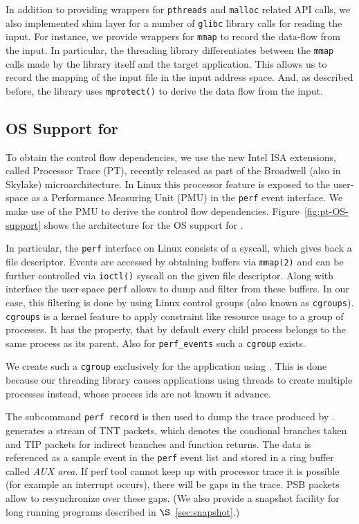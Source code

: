  In addition to providing wrappers for {\tt pthreads} and {\tt malloc} related API calls, we also implemented shim layer for a number of {\tt glibc} library calls for reading the input. For instance, we provide wrappers for {\tt mmap} to record the data-flow from the input. In particular, the threading library differentiates between the {\tt mmap} calls made by the library itself and the target application. This allows us to record the mapping of the input file in the input address space. And, as described before, the library uses {\tt mprotect()} to derive the data flow from the input. 


\subsection{OS Support for \intelpt}

To obtain the control flow dependencies, we use the new Intel ISA extensions, called Processor Trace (PT), recently released as part of the Broadwell (also in Skylake) microarchitecture. In Linux this processor feature is exposed to the user-space as a Performance Measuring Unit (PMU) in the {\tt perf} event interface. We make use of the \intelpt PMU to derive the control flow dependencies. Figure~\ref{fig:pt-OS-support} shows the architecture for the OS support for \intelpt.



In particular, the {\tt perf} interface on Linux consists of a syscall, which gives back a file
descriptor. Events are accessed by obtaining buffers via {\tt mmap(2)} and can be
further controlled via {\tt ioctl()} syscall on the given file descriptor. Along with
interface the user-space {\tt perf} allows to dump and filter from these
buffers. In our case, this filtering is done by using Linux control
groups (also known as {\tt cgroups}). {\tt cgroups} is a kernel feature to apply constraint
like resource usage to a group of processes. It has the property, that by
default every child process belongs to the same process as its parent. Also for
{\tt perf\_events} such a {\tt cgroup} exists.

We create such a {\tt cgroup} exclusively for the application using \projecttitle. This is done because
our threading library causes applications using threads to create multiple
processes instead, whose process ids are not known it advance.
 
The subcommand {\tt perf record} is then used to dump the trace produced by \intelpt.
\intelpt generates a stream of TNT packets, which denotes the
condional branches taken and TIP packets for indirect branches and function
returns. The data is referenced as a sample event in the {\tt perf} event list and
stored in a ring buffer called \emph{AUX area}. If perf tool cannot
keep up with processor trace it is possible (for example an interrupt occurs),
there will be gaps in the trace. PSB packets allow to resynchronize over these
gaps. (We also provide a snapshot facility for long running programs described in $\S$~\ref{sec:snapshot}.)


